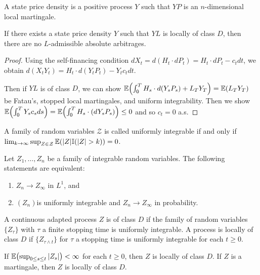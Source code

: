\begin{defn}
  \label{sec:arbitr-theory-cont-5}
  A state price density is a positive \ito process $Y$ such that $YP$
  is an $n$-dimensional local martingale.
\end{defn}

\begin{thm}
  \label{sec:arbitr-theory-cont-6}
  If there exists a state price density $Y$ such that $YL$ is locally
  of class $D$, then there are no $L$-admissible absolute arbitrages.
\end{thm}

\begin{proof}
  Using the self-financing condition $d X_{t} = d (H_{t} \cdot dP_{t})
  = H_{t} \cdot dP_{t} - c_{t} dt$, we obtain $d(X_{t} Y_{t}) = H_{t}
  \cdot d(Y_{t} P_{t}) - Y_{t} c_{t} dt$.

  Then if $YL$ is of class $D$, we can show $\E{\int_{0}^{T} H_{s}
    \cdot d(Y_{s} P_{s}) + L_{T} Y_{T}} = \E{L_{T} Y_{T}}$ be Fatau's,
  stopped local martingales, and uniform integrability.  Then we show
  $\E{\int_{0}^{T} Y_{s} c_{s} ds} = \E{\int_{0}^{T} H_{s} \cdot
  (dY_{s} P_{s})} \leq 0$ and so $c_{t} = 0$ a.s.
\end{proof}

\begin{defn}
  \label{sec:arbitr-theory-cont-7}
  A family of random variables $\mathcal{Z}$ is called uniformly
  integrable if and only if $\lim_{k \rightarrow \infty} \sup_{Z \in
    \mathcal{Z}} \E{|Z| \I{|Z| > k}} = 0$.
\end{defn}

\begin{thm}
  \label{sec:arbitr-theory-cont-8}
  Let $Z_{1}, \dots, Z_{n}$ be a family of integrable random
  variables. The following statements are equivalent:
  \begin{enumerate}
  \item $Z_{n} \rightarrow Z_{\infty}$ in $L^{1}$, and
  \item $(Z_{n})$is uniformly integrable and $Z_{n} \rightarrow
    Z_{\infty}$ in probability.
  \end{enumerate}
\end{thm}

\begin{defn}
  \label{sec:arbitr-theory-cont-9}
  A continuous adapted process $Z$ is of class $D$ if the family of
  random variables $\{ Z_{\tau} \}$ with $\tau$ a finite stopping time
  is uniformly integrable.  A process is locally of class $D$ if $\{
  Z_{\tau \wedge t} \} $ for $\tau$ a stopping time is uniformly
  integrable for each $t \geq 0$.

  If $\E{\sup_{0 \leq s \leq t}|Z_{s}|} < \infty$ for each $t \geq 0$,
  then $Z$ is locally of class $D$.  If $Z$ is a martingale, then $Z$
  is locally of class $D$.
\end{defn}

